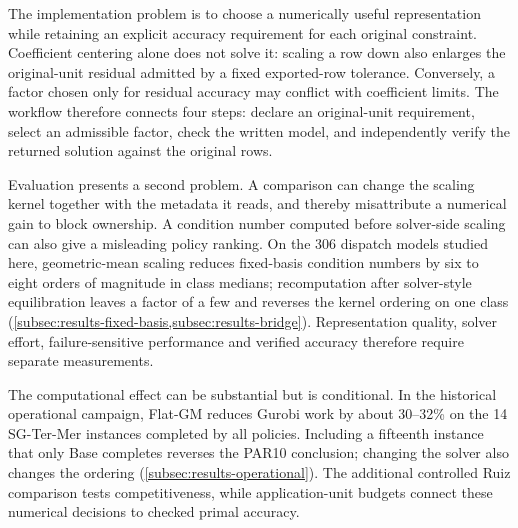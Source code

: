 \documentclass[11pt]{article}
\theoremstyle{definition}
\theoremstyle{remark}
\begin{document}
The implementation problem is to choose a numerically useful representation while retaining
an explicit accuracy requirement for each original constraint. Coefficient centering alone
does not solve it: scaling a row down also enlarges the original-unit residual admitted by a
fixed exported-row tolerance. Conversely, a factor chosen only for residual accuracy may
conflict with coefficient limits. The workflow therefore connects four steps: declare
an original-unit requirement, select an admissible factor, check the written model,
and independently verify the returned solution against the original rows.

Evaluation presents a second problem. A comparison can change the scaling kernel together
with the metadata it reads, and thereby misattribute a numerical gain to block ownership.
A condition number computed before solver-side scaling can also give a misleading policy
ranking. On the 306 dispatch models studied here, geometric-mean scaling reduces fixed-basis
condition numbers by six to eight orders of magnitude in class medians; recomputation after
solver-style equilibration leaves a factor of a few and reverses the kernel ordering on one
class (\cref{subsec:results-fixed-basis,subsec:results-bridge}). Representation quality,
solver effort, failure-sensitive performance and verified accuracy therefore require separate
measurements.

The computational effect can be substantial but is conditional. In the historical operational
campaign, Flat-GM reduces Gurobi work by about 30--32\% on the 14 SG-Ter-Mer instances
completed by all policies. Including a fifteenth instance that only Base completes reverses
the PAR10 conclusion; changing the solver also changes the ordering
(\cref{subsec:results-operational}). The additional controlled Ruiz comparison tests competitiveness, while
application-unit budgets connect these numerical decisions to checked primal accuracy.
\end{document}
